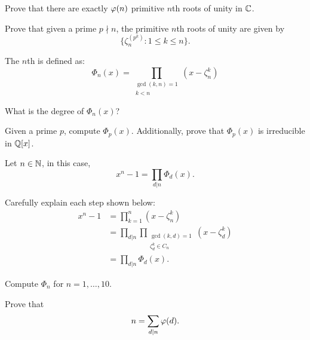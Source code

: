 \documentclass{ximera}
\begin{document}
\begin{exercise}
  Prove that there are exactly $\eulerphi(n)$ primitive $n$th roots of
  unity in $\mathbb C$.
\end{exercise}


\begin{exercise}\label{E:KP}
  Prove that given a prime $p\nmid n$, the primitive $n$th roots of
  unity are given by
  \[
  \{\zeta_n^{(p^k)}: 1\le k \le n\}.
  \]
\end{exercise}




\begin{definition}
The $n$th  is defined as:
\[
\Phi_n(x) = \prod_{\substack{\gcd(k,n)=1 \\ k<n}}(x-\zeta_n^k)
\]
\end{definition}

\begin{exercise}
  What is the degree of $\Phi_n(x)$?
\end{exercise}

\begin{exercise}
  Given a prime $p$, compute $\Phi_p(x)$. Additionally, prove that
  $\Phi_p(x)$ is irreducible in $\mathbb Q[x]$.
\end{exercise}


\begin{theorem}
  Let $n\in \mathbb N$, in this case,
  \[
  x^n-1 = \prod_{d|n} \Phi_d(x).
  \]
  \begin{sketch}
    Carefully explain each step shown below:
    \begin{align*}
      x^n - 1 &= \prod_{k=1}^n (x-\zeta_n^k) \\
      &=\prod_{d|n}\prod_{\substack{\gcd(k,d) = 1\\ \zeta_d^k \in C_n}}(x-\zeta_d^k) \\
      &=\prod_{d|n} \Phi_d(x).
    \end{align*}
  \end{sketch}
\end{theorem}


\begin{exercise}
  Compute $\Phi_n$ for $n = 1, \dots, 10$.
\end{exercise}

\begin{exercise}
  Prove that 
  \[
  n = \sum_{d|n} \eulerphi(d).
  \]
\end{exercise}
\end{document}
